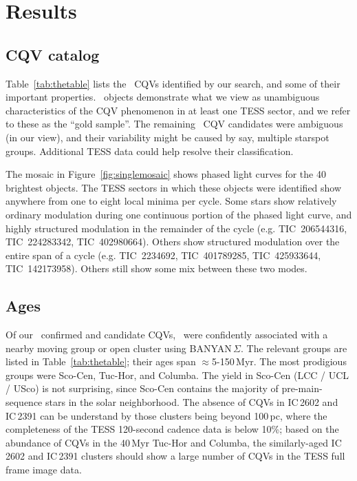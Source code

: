 \documentclass[11pt,twocolumn,tighten]{aastex63}
\begin{document}
\section{Results}
\label{sec:results}

\subsection{CQV catalog}

Table~\ref{tab:thetable} lists the \ncpvsfound\ CQVs identified by our
search, and some of their important properties.  \ngoods\ objects
demonstrate what we view as unambiguous characteristics of the CQV
phenomenon in at least one TESS sector, and we refer to these as the
``gold sample''.  The remaining \nmaybes\ CQV candidates were
ambiguous (in our view), and their variability might be caused by say,
multiple starspot groups.  Additional TESS data could help resolve
their classification.

The mosaic in Figure~\ref{fig:singlemosaic} shows phased light curves
for the 40 brightest objects.  The TESS sectors in which these objects
were identified show anywhere from one to eight local minima per
cycle.  Some stars show relatively ordinary modulation during one
continuous portion of the phased light curve, and highly structured
modulation in the remainder of the cycle (e.g. TIC~206544316,
TIC~224283342, TIC~402980664).  Others show structured modulation over
the entire span of a cycle (e.g. TIC~2234692, TIC~401789285,
TIC~425933644, TIC~142173958).  Others still show some mix between
these two modes.

\subsection{Ages}

Of our \ncpvsfound\ confirmed and candidate CQVs, \nnotfieldbanyan\
were confidently associated with a nearby moving group or open cluster
using BANYAN\,$\Sigma$.  The relevant groups are listed in
Table~\ref{tab:thetable}; their ages span $\approx$5-150\,Myr.  The
most prodigious groups were Sco-Cen, Tuc-Hor, and Columba.  The yield
in Sco-Cen (LCC / UCL / USco) is not surprising, since Sco-Cen
contains the majority of pre-main-sequence stars in the solar
neighborhood.  The absence of CQVs in IC\,2602 and IC\,2391 can be
understand by those clusters being beyond 100\,pc, where the
completeness of the TESS 120-second cadence data is below 10\%; based
on the abundance of CQVs in the 40\,Myr Tuc-Hor and Columba, the
similarly-aged IC\,2602 and IC\,2391 clusters should show a large
number of CQVs in the TESS full frame image data.
\end{document}
